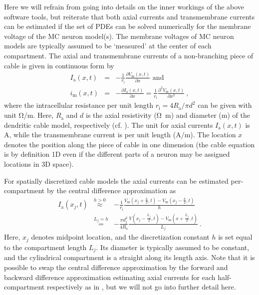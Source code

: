 Here we will refrain from going into details on the inner workings of the above software tools,
but reiterate that both axial currents and transmembrane currents can be estimated if the set of PDEs can be solved numerically for the membrane voltage of the MC neuron model(s).
The membrane voltages of MC neuron models are typically assumed to be `measured' at the center of each compartment.
The axial and transmembrane currents of a non-branching piece of cable is given in continuous form by
%
\begin{eqnarray}
I_\mathrm{a}(x,t) &=& - \frac{1}{r_\mathrm{i}} \frac{\partial V_\mathrm{m}(x, t)}{\partial x} \text{~and} \\
i_\mathrm{m}(x, t) &=& - \frac{\partial I_\mathrm{a} (x, t)}{\partial x} = \frac{1}{r_\mathrm{i}} \frac{\partial^2 V_\mathrm{m}(x,t)}{\partial x^2}~,
\label{eq:LFPy_ia_im_continuous}
\end{eqnarray}
%
where the intracellular resistance per unit length $r_\mathrm{i}=4R_\mathrm{a}/\pi d^2$ can be given with unit \si{\ohm/\metre}.
Here, $R_\mathrm{a}$  and $d$ is the axial resistivity (\si{\ohm\metre}) and diameter (\si{\metre}) of the dendritic cable model, respectively (cf. ).
The unit for axial currents $I_\mathrm{a}(x, t)$ is \si{\ampere},
while the transmembrane current is per unit length (\si{\ampere/\metre}).
The location $x$ denotes the position along the piece of cable in one dimension (the cable equation is by definition 1D even if the different parts of a neuron may be assigned locations in 3D space).

For spatially discretized cable models the axial currents can be estimated per-compartment by the central difference approximation as
%
\begin{eqnarray}
I_\mathrm{a}(x_j, t) &\overset{h>0}{\approx}& - \frac{1}{r_\mathrm{i}} \frac{V_\mathrm{m}(x_j+\frac{h}{2}, t) - V_\mathrm{m}(x_j-\frac{h}{2}, t)}{h} \nonumber \\
		  &\overset{L_j=h}{=}& - \frac{\pi d_j^2}{4 R_\mathrm{a}} \frac{V(x_j - \frac{L_j}{2}, t) - V_\mathrm{m}(x + \frac{L_j}{2}, t)}{L_j} ~.
\label{eq:LFPy_ia_discrete}
\end{eqnarray}
%
Here, $x_j$ denotes midpoint location,
and the discretization constant $h$ is set equal to the compartment length $L_j$.
Its diameter is typically assumed to be constant,
and the cylindrical compartment is a straight along its length axis.
Note that it is possible to swap the central difference approximation
by the forward and  backward difference approximation estimating axial currents for each half-compartment respectively as in \cite{Hagen2018},
but we will not go into further detail here.

